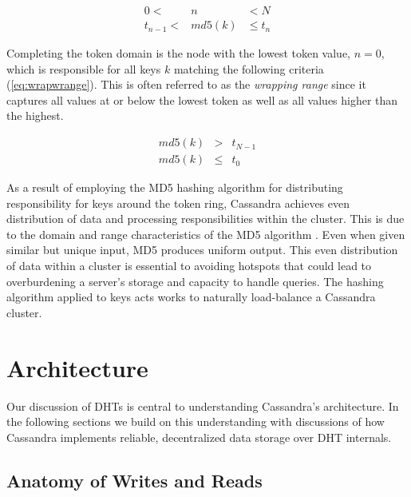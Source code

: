 \documentclass[twocolumn]{article}
\begin{document}
\begin{eqnarray*}
  0       <  &   n    &  <  N  \\
  t_{n-1} <  & md5(k) & \le t_n
\end{eqnarray*}

\noindent
Completing the token domain is the node with the lowest token value, $n = 0$, which is responsible for all keys $k$ matching the following criteria (\ref{eq:wrapwrange}).  This is often referred to as the \emph{wrapping range} since it captures all values at or below the lowest token as well as all values higher than the highest.

\begin{eqnarray}
  md5(k)  &   >   &  t_{N-1}  \nonumber\\
  md5(k)  &  \le  &  t_0      \label{eq:wrapwrange}
\end{eqnarray}

\noindent
As a result of employing the MD5 hashing algorithm for distributing responsibility for keys around the token ring, Cassandra achieves even distribution of data and processing responsibilities within the cluster.  This is due to the domain and range characteristics of the MD5 algorithm \cite{ref:md5}. Even when given similar but unique input, MD5 produces uniform output.  This even distribution of data within a cluster is essential to avoiding hotspots that could lead to overburdening a server's storage and capacity to handle queries.  The hashing algorithm applied to keys acts works to naturally load-balance a Cassandra cluster. 

\section{Architecture}\label{s:architecture}

Our discussion of DHTs is central to understanding Cassandra's architecture.  In the following sections we build on this understanding with discussions of how Cassandra implements reliable, decentralized data storage over DHT internals.

\subsection{Anatomy of Writes and Reads}\label{s:write}
\end{document}
